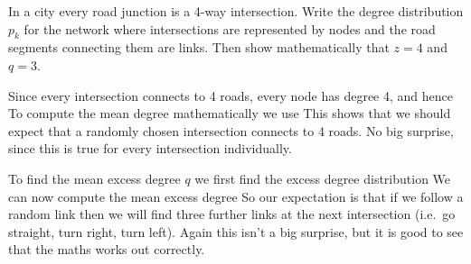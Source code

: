 In a city every road junction is a 4-way intersection. Write the degree distribution $p_k$ for the network where intersections are represented by nodes and the road segments connecting them are links. Then show mathematically that $z=4$ and $q=3$. 

\solution
Since every intersection connects to 4 roads, every node has degree 4, and hence 
To compute the mean degree mathematically we use 
This shows that we should expect that a randomly chosen intersection connects to 4 roads. No big surprise, since this is true for every intersection individually.

To find the mean excess degree $q$ we first find the excess degree distribution
We can now compute the mean excess degree 
So our expectation is that if we follow a random link then we will find three further links at the next intersection (i.e.~go straight, turn right, turn left). Again this isn't a big surprise, but it is good to see that the maths works out correctly. 